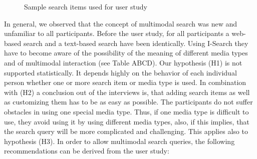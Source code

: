 \documentclass[runningheads,a4paper]{llncs} \usepackage[utf8]{inputenc}
\begin{document}
\begin{figure}[h!]
\hfill 
{}\hfill 
{}
\caption{Sample search items used for user study}
\end{figure}

In general, we observed that the concept of multimodal search was new and
unfamiliar to all participants. Before the user study, for all participants a
web-based search and a text-based search have been identically. Using I-Search
they have to become aware of the possibility of the meaning of different media
types and of multimodal interaction (see Table ABCD). Our hypothesis (H1) is not
supported statistically. It depends highly on the behavior of each individual
person whether one or more search item or media type is used. In combination
with (H2) a conclusion out of the interviews is, that adding search items as
well as customizing them has to be as easy as possible. The participants do not
suffer obstacles in using one special media type. Thus, if one media type is
difficult to use, they avoid using it by using different media types, also, if
this implies, that the search query will be more complicated and challenging.
This applies also to hypothesis (H3). In order to allow multimodal search
queries, the following recommendations can be derived from the user study: 
\end{document}
